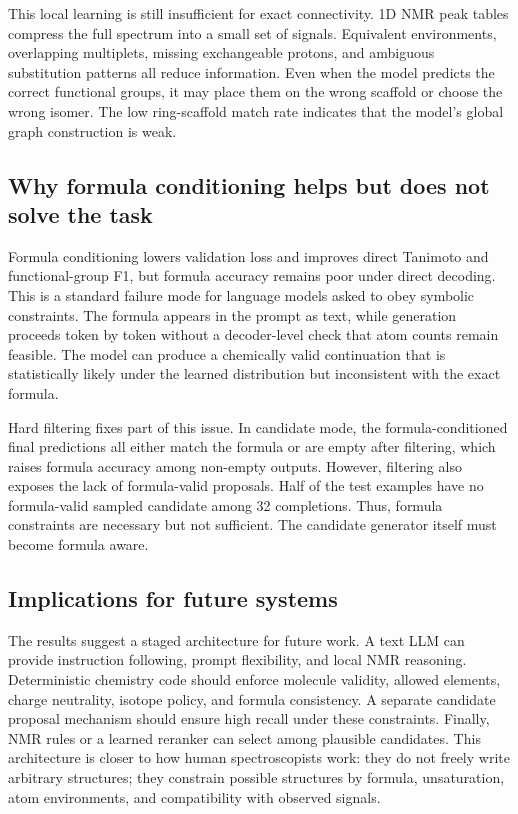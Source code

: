 \documentclass{article}
\begin{document}
This local learning is still insufficient for exact connectivity. 1D NMR peak tables compress the full spectrum into a small set of signals. Equivalent environments, overlapping multiplets, missing exchangeable protons, and ambiguous substitution patterns all reduce information. Even when the model predicts the correct functional groups, it may place them on the wrong scaffold or choose the wrong isomer. The low ring-scaffold match rate indicates that the model's global graph construction is weak.

\subsection{Why formula conditioning helps but does not solve the task}

Formula conditioning lowers validation loss and improves direct Tanimoto and functional-group F1, but formula accuracy remains poor under direct decoding. This is a standard failure mode for language models asked to obey symbolic constraints. The formula appears in the prompt as text, while generation proceeds token by token without a decoder-level check that atom counts remain feasible. The model can produce a chemically valid continuation that is statistically likely under the learned distribution but inconsistent with the exact formula.

Hard filtering fixes part of this issue. In candidate mode, the formula-conditioned final predictions all either match the formula or are empty after filtering, which raises formula accuracy among non-empty outputs. However, filtering also exposes the lack of formula-valid proposals. Half of the test examples have no formula-valid sampled candidate among 32 completions. Thus, formula constraints are necessary but not sufficient. The candidate generator itself must become formula aware.

\subsection{Implications for future systems}

The results suggest a staged architecture for future work. A text LLM can provide instruction following, prompt flexibility, and local NMR reasoning. Deterministic chemistry code should enforce molecule validity, allowed elements, charge neutrality, isotope policy, and formula consistency. A separate candidate proposal mechanism should ensure high recall under these constraints. Finally, NMR rules or a learned reranker can select among plausible candidates. This architecture is closer to how human spectroscopists work: they do not freely write arbitrary structures; they constrain possible structures by formula, unsaturation, atom environments, and compatibility with observed signals.
\end{document}
